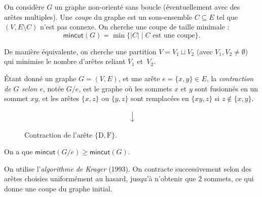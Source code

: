 \documentclass[./main]{subfiles}
\begin{document}
  \begin{exm}
    \label{exm:chap0-exm2}
    On considère $G$ un graphe non-orienté sans boucle (éventuellement avec des arêtes multiples).
    Une \textit{coupe} du graphe est un sous-ensemble $C \subseteq E$ tel que $(V, E \setminus C)$ n'est pas connexe.
    On cherche une coupe de taille minimale :
    \[
    \mathsf{mincut}(G) = \min \{|C|  \mid C \text{ est une coupe}\} 
    .\]

    De manière équivalente, on cherche une partition $V = V_1 \sqcup V_2$ (avec $V_1, V_2 \neq \emptyset$) qui minimise le nombre d'arêtes reliant $V_1$ et~$V_2$.

    Étant donné un graphe $G = (V, E)$, et une arête  $e = \{x,y\} \in E$, la \textit{contraction de $G$ selon $e$}, notée $G / e$, est le graphe où les sommets $x$ et $y$ sont fusionnés en un sommet $xy$, et les arêtes $\{x,z\}$ ou $\{y,z\}$ sont remplacées en $\{xy, z\}$ si $z \not\in  \{x,y\}$.

    \begin{figure}[H]
      \centering
      \[
      \vertical\longrightarrow
      \]
      \caption{Contraction de l'arête $\{\mathrm{D}, \mathrm{F}\}$.}
    \end{figure}

    On a que $\mathsf{mincut}(G / e) \ge \mathsf{mincut}(G)$.

    On utilise l'\textit{algorithme de Krager} (1993).
    On contracte successivement selon des arêtes choisies uniformément au hasard, jusqu'à n'obtenir que $2$ sommets, ce qui donne une coupe du graphe initial.
  \end{exm}
\end{document}
